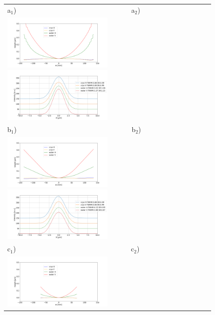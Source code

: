 \documentclass{iucr}              %
\begin{document}
   \begin{figure}
   \label{fig:intensitycorrected} 
   \begin{center}
   \begin{tabular}{l} 
  a$_1$)~~~~~~~~~~~~~~~~~~~~~~~~~~~~~~~~~
  a$_2$)\\

    \includegraphics[width=0.5\textwidth]{figures/correctionprofiles.png}
    \includegraphics[width=0.5\textwidth]{figures/intensitycorrected.png} \\ 
  b$_1$)~~~~~~~~~~~~~~~~~~~~~~~~~~~~~~~~~
  b$_2$)\\
   \includegraphics[width=0.5\textwidth]{figures/correctionprofilesextrapolated.png}
   \includegraphics[width=0.5\textwidth]{figures/intensitycorrectedextrapolated.png} \\   
  c$_1$)~~~~~~~~~~~~~~~~~~~~~~~~~~~~~~~~~
  c$_2$)\\
   \includegraphics[width=0.5\textwidth]{figures/correctionprofilescropped.png}

\end{tabular}
\end{center}
\end{figure}
\end{document}
